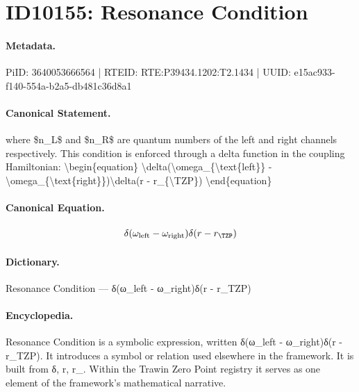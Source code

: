 \section*{ID10155: Resonance Condition}
\paragraph{Metadata.}
PiID: 3640053666564 | RTEID: RTE:P39434.1202:T2.1434 | UUID: e15ac933-f140-554a-b2a5-db481c36d8a1

\paragraph{Canonical Statement.}
where \$n\_L\$ and \$n\_R\$ are quantum numbers of the left and right channels respectively. This condition is enforced through a delta function in the coupling Hamiltonian: \textbackslash{}begin\{equation\} \textbackslash{}delta(\textbackslash{}omega\_\{\textbackslash{}text\{left\}\} - \textbackslash{}omega\_\{\textbackslash{}text\{right\}\})\textbackslash{}delta(r - r\_\{\textbackslash{}TZP\}) \textbackslash{}end\{equation\}

\paragraph{Canonical Equation.}
\[
\delta(\omega_{\text{left}} - \omega_{\text{right}})\delta(r - r_{\TZP})
\]

\paragraph{Dictionary.}
Resonance Condition — δ(ω\_left - ω\_right)δ(r - r\_TZP)

\paragraph{Encyclopedia.}
Resonance Condition is a symbolic expression, written δ(ω\_left - ω\_right)δ(r - r\_TZP). It introduces a symbol or relation used elsewhere in the framework. It is built from δ, r, r\_. Within the Trawin Zero Point registry it serves as one element of the framework's mathematical narrative.
